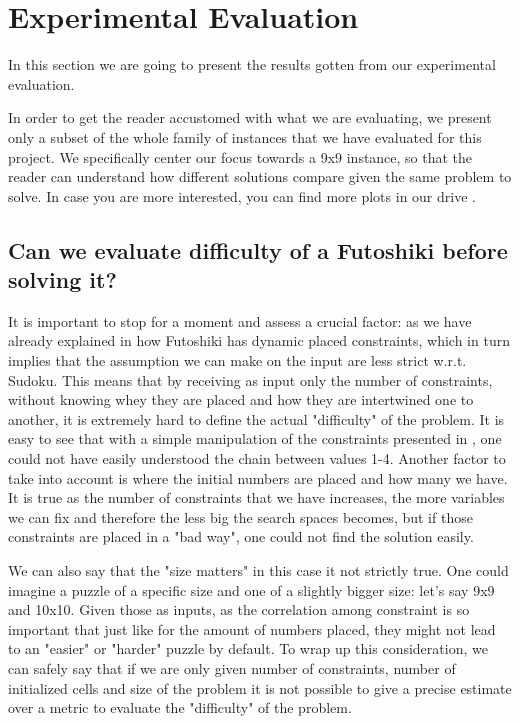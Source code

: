\section{Experimental Evaluation}
\label{sec:evaluation}

In this section we are going to present the results gotten from our experimental evaluation.



In order to get the reader accustomed with what we are evaluating, we present only a subset of the whole family of instances that we have evaluated for this project. We specifically center our focus towards a 9x9 instance, so that the reader can understand how different solutions compare given the same problem to solve. In case you are more interested, you can find more plots in our drive .


\subsection{Can we evaluate difficulty of a Futoshiki before solving it?}
\label{subsec:futoshiki_difficulty}
It is important to stop for a moment and assess a crucial factor: as we have already explained in  how Futoshiki has dynamic placed constraints, which in turn implies that the assumption we can make on the input are less strict w.r.t. Sudoku. This means that by receiving as input only the number of constraints, without knowing whey they are placed and how they are intertwined one to another, it is extremely hard to define the actual "difficulty" of the problem. It is easy to see that with a simple manipulation of the constraints presented in , one could not have easily understood the chain between values 1-4. Another factor to take into account is where the initial numbers are placed and how many we have. It is true as the number of constraints that we have increases, the more variables we can fix and therefore the less big the search spaces becomes, but if those constraints are placed in a "bad way", one could not find the solution easily.

We can also say that the "size matters" in this case it not strictly true. One could imagine a puzzle of a specific size and one of a slightly bigger size: let's say 9x9 and 10x10. Given those as inputs, as the correlation among constraint is so important that just like for the amount of numbers placed, they might not lead to an "easier" or "harder" puzzle by default.
To wrap up this consideration, we can safely say that if we are only given number of constraints, number of initialized cells and size of the problem it is not possible to give a precise estimate over a metric to evaluate the "difficulty" of the problem.

